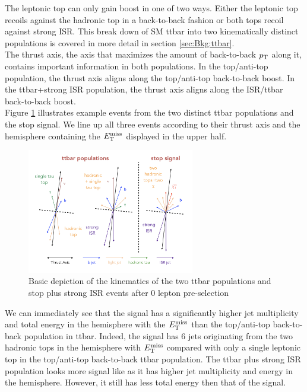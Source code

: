 \indent  The leptonic top can only gain boost in one of two ways.  Either the leptonic top recoils against the hadronic top in a back-to-back fashion or both tops recoil against strong ISR.  This break down of SM ttbar into two kinematically distinct populations is covered in more detail in section \ref{sec:Bkg:ttbar}.  \\

\indent The thrust axis, the axis that maximizes the amount of back-to-back $p_{\mathrm{T}}$ along it, contains important information in both populations.  In the top/anti-top population, the thrust axis aligns along the top/anti-top back-to-back boost.  In the ttbar+strong ISR population, the thrust axis aligns along the ISR/ttbar back-to-back boost.  \\

\indent Figure \ref{fig:ttbar:3pop} illustrates example events from the two distinct ttbar populations and the stop signal.  We line up all three events according to their thrust axis and the hemisphere containing the $E_{\mathrm{T}}^{\mathrm{miss}}$ displayed in the upper half.  \\

\begin{figure}[h!]
  \centering
	\includegraphics[width=0.65\textwidth]{./figures/strategy/ttbar_vs_signal.png}
\caption{\label{fig:ttbar:3pop}{Basic depiction of the kinematics of the two ttbar populations and stop plus strong ISR events after 0 lepton pre-selection }}
\end{figure}

\indent We can immediately see that the signal has a  significantly higher jet multiplicity and total energy in the hemisphere with the $E_{\mathrm{T}}^{\mathrm{miss}}$ than the top/anti-top back-to-back population in ttbar.  Indeed, the signal has 6 jets originating from the two hadronic tops in the hemisphere with $E_{\mathrm{T}}^{\mathrm{miss}}$ compared with only a single leptonic top in the top/anti-top back-to-back ttbar population.   The ttbar plus strong ISR population looks more signal like as it has higher jet multiplicity and energy in the \MET hemisphere. However, it still has less total energy then that of the signal.  \\

